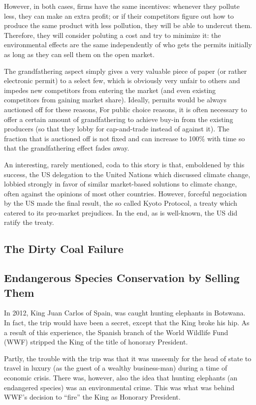 However, in both cases, firms have the same incentives: whenever they pollute
less, they can make an extra profit; or if their competitors figure out how to
produce the same product with less pollution, they will be able to undercut
them. Therefore, they will consider poluting a cost and try to minimize it: the
environmental effects are the same independently of who gets the permits
initially as long as they can sell them on the open market.

The grandfathering aspect simply gives a very valuable piece of paper (or
rather electronic permit) to a select few, which is obviously very unfair to
others and impedes new competitors from entering the market (and even existing
competitors from gaining market share). Ideally, permits would be always
auctioned off for these reasons, For public choice reasons, it is often
necessary to offer a certain amount of grandfathering to achieve buy-in from
the existing producers (so that they lobby for cap-and-trade instead of against
it). The fraction that is auctioned off is not fixed and can increase to 100\%
with time so that the grandfathering effect fades away.

An interesting, rarely mentioned, coda to this story is that, emboldened by
this success, the US delegation to the United Nations which discussed climate
change, lobbied strongly in favor of similar market-based solutions to climate
change, often against the opinions of most other countries. However, forceful
negociation by the US made the final result, the so called Kyoto Protocol, a
treaty which catered to its pro-market prejudices. In the end, as is
well-known, the US did ratify the treaty.

\subsection{The Dirty Coal Failure}

\subsection{Endangerous Species Conservation by Selling Them}

In 2012, King Juan Carlos of Spain, was caught hunting elephants in Botswana.
In fact, the trip would have been a secret, except that the King broke his hip.
As a result of this experience, the Spanish branch of the World Wildlife Fund
(WWF) stripped the King of the title of honorary President.

Partly, the trouble with the trip was that it was unseemly for the head of
state to travel in luxury (as the guest of a wealthy business-man) during a
time of economic crisis. There was, however, also the idea that hunting
elephants (an endangered species) was an environmental crime. This was what was
behind WWF's decision to ``fire'' the King as Honorary President.

